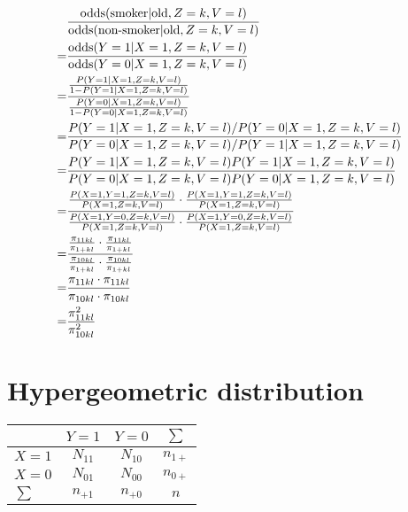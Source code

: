 \documentclass{article}
\begin{document}
\begin{align*}
    & \frac{\operatorname{odds}(\text{smoker}|\text{old},Z=k,V=l)}{\operatorname{odds}(\text{non-smoker}|\text{old},Z=k,V=l)} \\
    =& \frac{\operatorname{odds}(Y=1|X=1,Z=k,V=l)}{\operatorname{odds}(Y=0|X=1,Z=k,V=l)} \\
    =& \frac{\frac{P(Y=1|X=1,Z=k,V=l)}{1-P(Y=1|X=1,Z=k,V=l)}}{\frac{P(Y=0|X=1,Z=k,V=l)}{1-P(Y=0|X=1,Z=k,V=l)}} \\
    =& \frac{P(Y=1|X=1,Z=k,V=l)/P(Y=0|X=1,Z=k,V=l)}{P(Y=0|X=1,Z=k,V=l)/P(Y=1|X=1,Z=k,V=l)} \\
    =& \frac{P(Y=1|X=1,Z=k,V=l)P(Y=1|X=1,Z=k,V=l)}{P(Y=0|X=1,Z=k,V=l)P(Y=0|X=1,Z=k,V=l)} \\
    =& \frac{\frac{P(X=1,Y=1,Z=k,V=l)}{P(X=1,Z=k,V=l)}\cdot\frac{P(X=1,Y=1,Z=k,V=l)}{P(X=1,Z=k,V=l)}}{\frac{P(X=1,Y=0,Z=k,V=l)}{P(X=1,Z=k,V=l)}\cdot\frac{P(X=1,Y=0,Z=k,V=l)}{P(X=1,Z=k,V=l)}} \\
    =& \frac{\frac{\pi_{11kl}}{\pi_{1+kl}}\cdot\frac{\pi_{11kl}}{\pi_{1+kl}}}{\frac{\pi_{10kl}}{\pi_{1+kl}}\cdot\frac{\pi_{10kl}}{\pi_{1+kl}}} \\
    =& \frac{\pi_{11kl}\cdot\pi_{11kl}}{\pi_{10kl}\cdot\pi_{10kl}} \\
    =& \frac{\pi_{11kl}^2}{\pi_{10kl}^2} \\
\end{align*}

\section{Hypergeometric distribution}

\begin{table}[h!]
\centering
\begin{tabular}{l|c c c}
 & \(Y=1\) & \(Y=0\) & \(\sum\) \\ \hline
\(X=1\) & \(N_{11}\) & \(N_{10}\) & \(n_{1+}\) \\
\(X=0\) & \(N_{01}\) & \(N_{00}\) & \(n_{0+}\) \\
\(\sum\) & \(n_{+1}\) & \(n_{+0}\) & \(n\) \\
\end{tabular}
\label{tab:2way}
\end{table}
\end{document}
